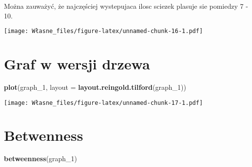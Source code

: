 \documentclass[]{article}
\newenvironment{Shaded}{\begin{snugshade}}{\end{snugshade}}
\newcommand{\KeywordTok}[1]{\textcolor[rgb]{0.13,0.29,0.53}{\textbf{#1}}}
\newcommand{\DataTypeTok}[1]{\textcolor[rgb]{0.13,0.29,0.53}{#1}}
\newcommand{\DecValTok}[1]{\textcolor[rgb]{0.00,0.00,0.81}{#1}}
\newcommand{\StringTok}[1]{\textcolor[rgb]{0.31,0.60,0.02}{#1}}
\newcommand{\OperatorTok}[1]{\textcolor[rgb]{0.81,0.36,0.00}{\textbf{#1}}}
\newcommand{\NormalTok}[1]{#1}
\begin{document}
Można zauważyć, że najczęściej wystepujaca ilosc sciezek plasuje sie
pomiedzy 7 - 10.

\begin{Shaded}
\end{Shaded}

\texttt{[image: Własne\_files/figure-latex/unnamed-chunk-16-1.pdf]}

\section{Graf w wersji drzewa}\label{graf-w-wersji-drzewa}

\begin{Shaded}
\begin{Highlighting}[]
\KeywordTok{plot}\NormalTok{(graph_}\DecValTok{1}\NormalTok{,}
     \DataTypeTok{layout =} \KeywordTok{layout.reingold.tilford}\NormalTok{(graph_}\DecValTok{1}\NormalTok{))}
\end{Highlighting}
\end{Shaded}

\texttt{[image: Własne\_files/figure-latex/unnamed-chunk-17-1.pdf]}

\section{Betwenness}\label{betwenness}

\begin{Shaded}
\begin{Highlighting}[]
\KeywordTok{betweenness}\NormalTok{(graph_}\DecValTok{1}\NormalTok{)}
\end{Highlighting}
\end{Shaded}
\end{document}
